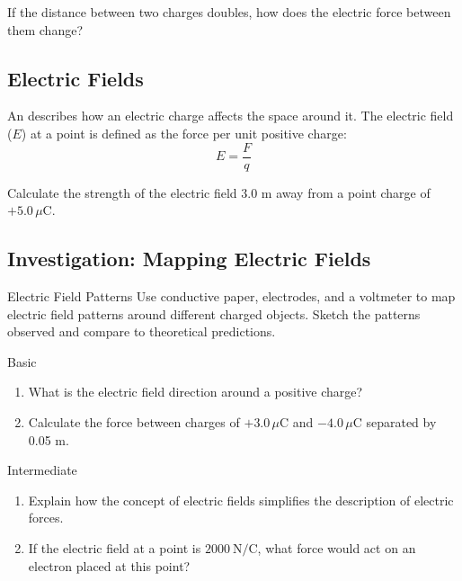 
\begin{stopandthink}
If the distance between two charges doubles, how does the electric force between them change?
\end{stopandthink}

\subsection{Electric Fields}
\FloatBarrier

An  describes how an electric charge affects the space around it. The electric field ($E$) at a point is defined as the force per unit positive charge:
\[
E = \frac{F}{q}
\]

\begin{example}
Calculate the strength of the electric field 3.0 m away from a point charge of $+5.0\,\mu\text{C}$.
\end{example}


\subsection{Investigation: Mapping Electric Fields}
\FloatBarrier

\begin{investigation}{Electric Field Patterns}
Use conductive paper, electrodes, and a voltmeter to map electric field patterns around different charged objects. Sketch the patterns observed and compare to theoretical predictions.
\end{investigation}

\begin{tieredquestions}{Basic}
\begin{enumerate}
    \item What is the electric field direction around a positive charge?
    \item Calculate the force between charges of $+3.0\,\mu\text{C}$ and $-4.0\,\mu\text{C}$ separated by 0.05 m.
\end{enumerate}
\end{tieredquestions}

\begin{tieredquestions}{Intermediate}
\begin{enumerate}
    \item Explain how the concept of electric fields simplifies the description of electric forces.
    \item If the electric field at a point is $2000~\text{N/C}$, what force would act on an electron placed at this point?
\end{enumerate}
\end{tieredquestions}

